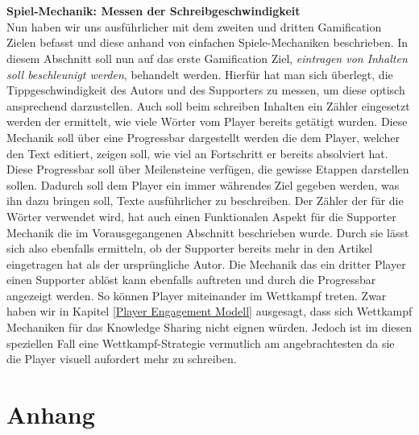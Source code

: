 \documentclass[a4paper,12pt,twoside]{scrartcl}
\begin{document}
\\\\
\textbf{Spiel-Mechanik: Messen der Schreibgeschwindigkeit}\\
Nun haben wir uns ausführlicher mit dem zweiten und dritten Gamification Zielen befasst und diese anhand von einfachen Spiele-Mechaniken beschrieben. In diesem Abschnitt soll nun auf das erste Gamification Ziel, \textit{eintragen von Inhalten soll beschleunigt werden}, behandelt werden. Hierfür hat man sich überlegt, die Tippgeschwindigkeit des Autors und des Supporters zu messen, um diese optisch ansprechend darzustellen. Auch soll beim schreiben Inhalten ein Zähler eingesetzt werden der ermittelt, wie viele Wörter vom Player bereits getätigt wurden. Diese Mechanik soll über eine Progressbar dargestellt werden die dem Player, welcher den Text editiert, zeigen soll, wie viel an Fortschritt er bereits absolviert hat. Diese Progressbar soll über Meilensteine verfügen, die gewisse Etappen darstellen sollen. Dadurch soll dem Player ein immer währendes Ziel gegeben werden, was ihn dazu bringen soll, Texte ausführlicher zu beschreiben. Der Zähler der für die Wörter verwendet wird, hat auch einen Funktionalen Aspekt für die Supporter Mechanik die im Vorausgegangenen Abschnitt beschrieben wurde. Durch sie lässt sich also ebenfalls ermitteln, ob der Supporter bereits mehr in den Artikel eingetragen hat als der ursprüngliche Autor. Die Mechanik das ein dritter Player einen Supporter ablöst kann ebenfalls auftreten und durch die Progressbar angezeigt werden. So können Player miteinander im Wettkampf treten. Zwar haben wir in Kapitel \ref{Player Engagement Modell} ausgesagt, dass sich Wettkampf Mechaniken für das Knowledge Sharing nicht eignen würden. Jedoch ist im diesen speziellen Fall eine Wettkampf-Strategie vermutlich am angebrachtesten da sie die Player visuell aufordert mehr zu schreiben.  





\newpage
\section{Anhang} 
%
\newpage
\listoftables
\listoffigures
\newpage

\end{document}
